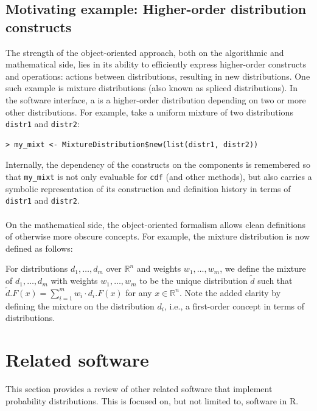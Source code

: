 \subsection{Motivating example: Higher-order distribution constructs}

The strength of the object-oriented approach, both on the algorithmic and mathematical side, lies in its ability to efficiently express higher-order constructs and operations: actions between distributions, resulting in new distributions. One such example is mixture distributions (also known as spliced distributions). In the  software interface, a  is a higher-order distribution depending on two or more other distributions. For example, take a uniform mixture of two distributions \texttt{distr1} and \texttt{distr2}:

\begin{verbatim}
> my_mixt <- MixtureDistribution$new(list(distr1, distr2))
\end{verbatim}
Internally, the dependency of the constructs on the components is remembered so that \texttt{my\_mixt} is not only evaluable for \texttt{cdf} (and other methods), but also carries a symbolic representation of its construction and definition history in terms of \texttt{distr1} and \texttt{distr2}.
\\\\
On the mathematical side, the object-oriented formalism allows clean definitions of otherwise more obscure concepts. For example, the mixture distribution is now defined as follows:

For distributions $d_1,\dots,d_m$ over $\mathbb{R}^n$ and weights $w_1,\dots, w_m$, we define the mixture of $d_1,\dots, d_m$ with weights $w_1,\dots, w_m$ to be the unique distribution $\tilde{d}$ such that $\tilde{d}.F(x) = \sum_{i=1}^m w_i\cdot d_i.F(x)$ for any $x\in \mathbb{R}^n$. Note the added clarity by defining the mixture on the distribution $d_i$, i.e., a first-order concept in terms of distributions.

\section{Related software}
\label{sec:tools_distr6_rel}

This section provides a review of other related software that implement probability distributions. This is focused on, but not limited to, software in R.

